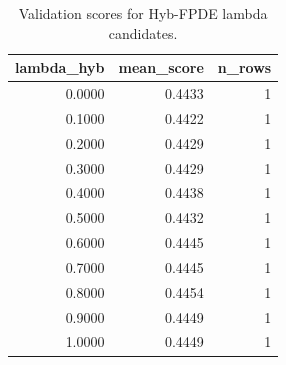 \begin{table}[t]
\caption{Validation scores for Hyb-FPDE lambda candidates.}
\label{tab:lambda_distribution_computed}
\centering
\begin{tabular}{rrr}
\toprule
lambda\_hyb & mean\_score & n\_rows \\
\midrule
0.0000 & 0.4433 & 1 \\
0.1000 & 0.4422 & 1 \\
0.2000 & 0.4429 & 1 \\
0.3000 & 0.4429 & 1 \\
0.4000 & 0.4438 & 1 \\
0.5000 & 0.4432 & 1 \\
0.6000 & 0.4445 & 1 \\
0.7000 & 0.4445 & 1 \\
0.8000 & 0.4454 & 1 \\
0.9000 & 0.4449 & 1 \\
1.0000 & 0.4449 & 1 \\
\bottomrule
\end{tabular}

\end{table}
